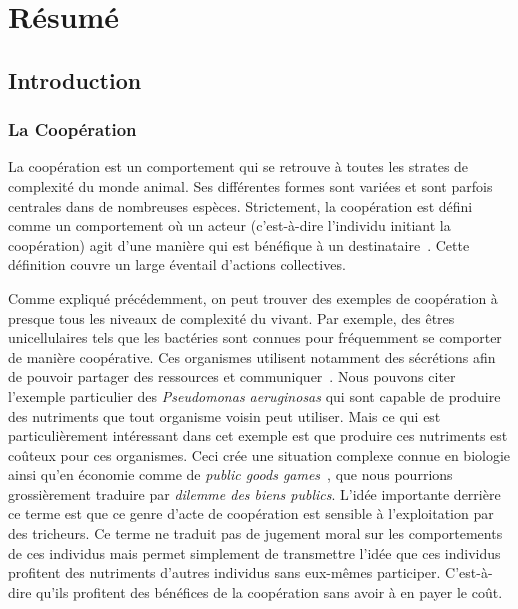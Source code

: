 \chapter{Résumé}

\minitoc[n] %

\section{Introduction}

	\subsection{La Coopération} %

		La coopération est un comportement qui se retrouve à toutes les strates de complexité du monde animal. Ses différentes formes sont variées et sont parfois centrales dans de nombreuses espèces. Strictement, la coopération est défini comme un comportement où un acteur (c'est-à-dire l'individu initiant la coopération) agit d'une manière qui est bénéfique à un destinataire~\parencite{West2007a}. Cette définition couvre un large éventail d'actions collectives.

		Comme expliqué précédemment, on peut trouver des exemples de coopération à presque tous les niveaux de complexité du vivant. Par exemple, des êtres unicellulaires tels que les bactéries sont connues pour fréquemment se comporter de manière coopérative. Ces organismes utilisent notamment des sécrétions afin de pouvoir partager des ressources et communiquer~\parencite{Elena2003}. Nous pouvons citer l'exemple particulier des \emph{Pseudomonas aeruginosas} qui sont capable de produire des nutriments que tout organisme voisin peut utiliser. Mais ce qui est particulièrement intéressant dans cet exemple est que produire ces nutriments est coûteux pour ces organismes. Ceci crée une situation complexe connue en biologie ainsi qu'en économie comme de \emph{public goods games}~\parencite{Popat2012, Harrison2013}, que nous pourrions grossièrement traduire par \emph{dilemme des biens publics}. L'idée importante derrière ce terme est que ce genre d'acte de coopération est sensible à l'exploitation par des tricheurs. Ce terme ne traduit pas de jugement moral sur les comportements de ces individus mais permet simplement de transmettre l'idée que ces individus profitent des nutriments d'autres individus sans eux-mêmes participer. C'est-à-dire qu'ils profitent des bénéfices de la coopération sans avoir à en payer le coût.

